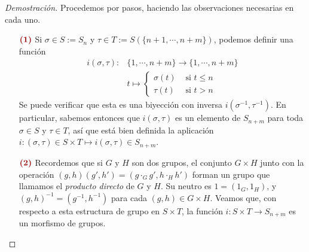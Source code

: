 \documentclass[11pt]{article}
\theoremstyle{colored}
\newcommand{\paint}[1]{\color{color}{#1}}
\newcommand{\tpaint}[1]{\paint{\textbf{#1}}}
\begin{document}
\begin{proof}[Demostración] Procedemos por pasos, haciendo las observaciones necesarias en cada uno.
\begin{itemize}[listparindent = \parindent]
\item[$\tpaint{(1)}$] Si $\sigma \in S:= S_n$ y $\tau \in T := S(\{n+1, \cdots, n+m\})$, podemos definir una función
\begin{align*}
i(\sigma,\tau) : &\{1, \cdots, n+m\} \to \{1,\cdots, n+m\}\\
&t \mapsto \begin{cases}
\sigma(t) & \text{ si $t \leq n$}\\
\tau(t) & \text{ si $t > n$}
\end{cases}
\end{align*}
Se puede verificar que esta es una biyección con inversa $i(\sigma^{-1}, \tau^{-1})$. En particular, sabemos entonces que $i(\sigma, \tau)$ es un elemento de $S_{n+m}$ para toda $\sigma \in S$ y $\tau \in T$, así que está bien definida la aplicación $i : (\sigma, \tau) \in S \times T \mapsto i(\sigma,\tau) \in S_{n+m}$.
\item[$\tpaint{(2)}$] Recordemos que si $G$ y $H$ son dos grupos, el conjunto $G \times H$ junto con la operación $(g,h)(g',h') = (g\cdot_G g', h \cdot_H h')$ forman un grupo que llamamos el \textit{producto directo} de $G$ y $H$. Su neutro es $1 = (1_G,1_H)$, y $(g,h)^{-1} = (g^{-1},h^{-1})$ para cada $(g,h) \in G \times H$. Veamos que, con respecto a esta estructura de grupo en $S \times T$, la función $i: S \times T \to S_{n+m}$ es un morfismo de grupos. 


\end{itemize}
\end{proof}
\end{document}
